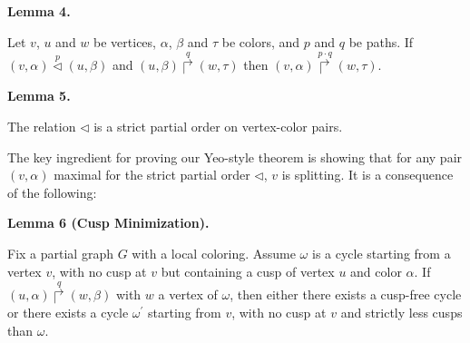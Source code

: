 \documentclass[10pt,a4paper]{amsart}
\begin{document}
 
 
 
\par\medskip\noindent\textbf{Lemma 4.}\par
 
 
Let $v$, $u$ and $w$ be vertices, $\alpha$, $\beta$ and $\tau$ be colors, and $p$ and $q$ be paths. If $(v,\alpha)\overset{p}{\lhd}(u,\beta)$ and $(u,\beta)\overset{q}{\Rsh}(w,\tau)$ then $(v,\alpha)\overset{p\cdot q}{\Rsh}(w,\tau)$.\par
 
 
 
 
\par\medskip\noindent\textbf{Lemma 5.}\par
 
 
The relation $\lhd$ is a strict partial order on vertex-color pairs.\par
 
 
 
 
The key ingredient for proving our Yeo-style theorem is showing that for any pair $(v,\alpha)$ maximal for the strict partial order $\lhd$, $v$ is splitting. It is a consequence of the following:\par
 

 
\par\medskip\noindent\textbf{Lemma 6 (Cusp Minimization).}\par
 
 
Fix a partial graph $G$ with a local coloring. Assume $\omega$ is a cycle starting from a vertex $v$, with no cusp at $v$ but containing a cusp of vertex $u$ and color $\alpha$. If $(u,\alpha)\overset{q}{\Rsh}(w,\beta)$ with $w$ a vertex of $\omega$, then either there exists a cusp-free cycle or there exists a cycle $\omega^{\prime}$ starting from $v$, with no cusp at $v$ and strictly less cusps than $\omega$.\par
 
\end{document}
